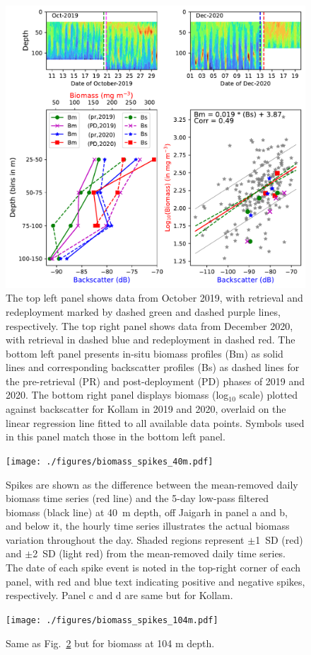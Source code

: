 \documentclass[12pt,a4paper]{article}
\begin{document}
\begin{figure}[htbp]
	\centering
	\includegraphics[width=\textwidth]{./figures/Kollam_2020_verification.pdf} 
	\caption{The top left panel shows data from October 2019, with retrieval and redeployment marked by dashed green and dashed purple lines, respectively. The top right panel shows data from December 2020, with retrieval in dashed blue and redeployment in dashed red. The bottom left panel presents in-situ biomass profiles (Bm) as solid lines and corresponding backscatter profiles (Bs) as dashed lines for the pre-retrieval (PR) and post-deployment (PD) phases of 2019 and 2020. The bottom right panel displays biomass (log$_{10}$ scale) plotted against backscatter for Kollam in 2019 and 2020, overlaid on the linear regression line fitted to all available data points. Symbols used in this panel match those in the bottom left panel.}
	\label{fig:kollam_verification_2020}
\end{figure}

\begin{figure}[htbp]
	\centering
	\texttt{[image: ./figures/biomass\_spikes\_40m.pdf]} 
	\caption{Spikes are shown as the difference between the mean-removed daily biomass time series (red line) and the 5-day low-pass filtered biomass (black line) at 40~m depth, off Jaigarh in panel a and b, and below it, the hourly time series illustrates the actual biomass variation throughout the day. Shaded regions represent $\pm$1~SD (red) and $\pm$2~SD (light red) from the mean-removed daily time series. The date of each spike event is noted in the top-right corner of each panel, with red and blue text indicating positive and negative spikes, respectively. Panel c and d are same but for Kollam.}
	\label{fig:biomass_spike_40m}
\end{figure}

\begin{figure}[htbp]
	\centering
	\texttt{[image: ./figures/biomass\_spikes\_104m.pdf]} 
	\caption{Same as Fig.~\ref{fig:biomass_spike_40m} but for biomass at 104 m depth.}
	\label{fig:biomass_spike_104m}
\end{figure}
\end{document}
